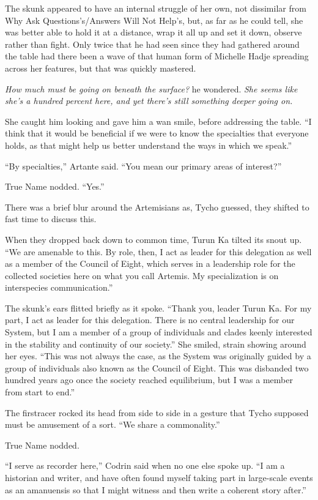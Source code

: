The skunk appeared to have an internal struggle of her own, not dissimilar from Why Ask Questions's/Answers Will Not Help's, but, as far as he could tell, she was better able to hold it at a distance, wrap it all up and set it down, observe rather than fight. Only twice that he had seen since they had gathered around the table had there been a wave of that human form of Michelle Hadje spreading across her features, but that was quickly mastered.

\emph{How much must be going on beneath the surface?} he wondered. \emph{She seems like she's a hundred percent here, and yet there's still something deeper going on.}

She caught him looking and gave him a wan smile, before addressing the table. ``I think that it would be beneficial if we were to know the specialties that everyone holds, as that might help us better understand the ways in which we speak.''

``By specialties,'' Artante said. ``You mean our primary areas of interest?''

True Name nodded. ``Yes.''

There was a brief blur around the Artemisians as, Tycho guessed, they shifted to fast time to discuss this.

When they dropped back down to common time, Turun Ka tilted its snout up. ``We are amenable to this. By role, then, I act as leader for this delegation as well as a member of the Council of Eight, which serves in a leadership role for the collected societies here on what you call Artemis. My specialization is on interspecies communication.''

The skunk's ears flitted briefly as it spoke. ``Thank you, leader Turun Ka. For my part, I act as leader for this delegation. There is no central leadership for our System, but I am a member of a group of individuals and clades keenly interested in the stability and continuity of our society.'' She smiled, strain showing around her eyes. ``This was not always the case, as the System was originally guided by a group of individuals also known as the Council of Eight. This was disbanded two hundred years ago once the society reached equilibrium, but I was a member from start to end.''

The firstracer rocked its head from side to side in a gesture that Tycho supposed must be amusement of a sort. ``We share a commonality.''

True Name nodded.

``I serve as recorder here,'' Codrin said when no one else spoke up. ``I am a historian and writer, and have often found myself taking part in large-scale events as an amanuensis so that I might witness and then write a coherent story after.''


